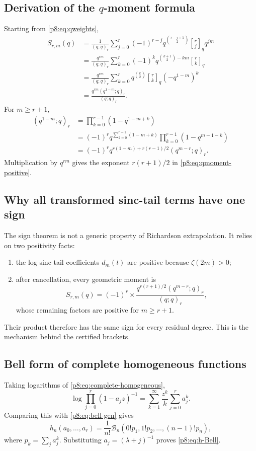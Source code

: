 \documentclass[11pt]{article}
\numberwithin{equation}{section}
\theoremstyle{definition}
\theoremstyle{remark}
\newcommand{\qbinom}[3]{\genfrac{[}{]}{0pt}{}{#1}{#2}_{#3}}
\begin{document}
\subsection{Derivation of the \texorpdfstring{$q$}{q}-moment formula}

Starting from \cref{p8:eq:qweights},
\begin{align*}
S_{r,m}(q)
&=\frac{1}{(q;q)_r}
\sum_{j=0}^{r}(-1)^{r-j}
q^{\binom{r-j+1}{2}}\qbinom{r}{j}{q} q^{jm}\\
&=\frac{q^{rm}}{(q;q)_r}
\sum_{k=0}^{r}(-1)^k q^{\binom{k+1}{2}-km}\qbinom{r}{k}{q}\\
&=\frac{q^{rm}}{(q;q)_r}
\sum_{k=0}^{r}q^{\binom{k}{2}}\qbinom{r}{k}{q}
(-q^{1-m})^k\\
&=\frac{q^{rm}(q^{1-m};q)_r}{(q;q)_r}.
\end{align*}
For $m\ge r+1$,
\begin{align*}
(q^{1-m};q)_r
&=\prod_{k=0}^{r-1}(1-q^{1-m+k})\\
&=(-1)^r q^{\sum_{k=0}^{r-1}(1-m+k)}
\prod_{k=0}^{r-1}(1-q^{m-1-k})\\
&=(-1)^r q^{r(1-m)+r(r-1)/2}(q^{m-r};q)_r.
\end{align*}
Multiplication by $q^{rm}$ gives the exponent $r(r+1)/2$ in \cref{p8:eq:qmoment-positive}.

\subsection{Why all transformed sinc-tail terms have one sign}

The sign theorem is not a generic property of Richardson extrapolation. It relies on two positivity facts:
\begin{enumerate}
\item the log-sinc tail coefficients $d_m(t)$ are positive because $\zeta(2m)>0$;
\item after cancellation, every geometric moment is
\[
S_{r,m}(q)=(-1)^r\times
\frac{q^{r(r+1)/2}(q^{m-r};q)_r}{(q;q)_r},
\]
whose remaining factors are positive for $m\ge r+1$.
\end{enumerate}
Their product therefore has the same sign for every residual degree. This is the mechanism behind the certified brackets.

\subsection{Bell form of complete homogeneous functions}

Taking logarithms of \cref{p8:eq:complete-homogeneous},
\[
\log\prod_{j=0}^{r}(1-a_jz)^{-1}
=\sum_{k=1}^{\infty}\frac{z^k}{k}\sum_{j=0}^{r}a_j^k.
\]
Comparing this with \cref{p8:eq:bell-gen} gives
\[
h_n(a_0,\ldots,a_r)
=\frac1{n!}\mathcal B_n\left(
0!p_1,1!p_2,\ldots,(n-1)!p_n\right),
\]
where $p_k=\sum_j a_j^k$. Substituting $a_j=(\lambda+j)^{-1}$ proves \cref{p8:eq:h-Bell}.
\end{document}
